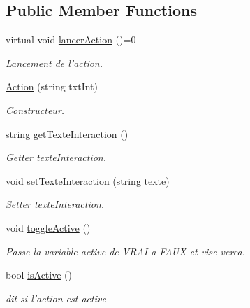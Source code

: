 \subsection*{Public Member Functions}
\begin{DoxyCompactItemize}
\item 
virtual void \hyperlink{classAction_a47d25fc7d6ef58692a7a4c5bc7e7fbd0}{lancer\-Action} ()=0
\begin{DoxyCompactList}\small\item\em Lancement de l'action. \end{DoxyCompactList}\item 
\hyperlink{classAction_ae7e1142cb3535c940dbc86f9a3b2da52}{Action} (string txt\-Int)
\begin{DoxyCompactList}\small\item\em Constructeur. \end{DoxyCompactList}\item 
string \hyperlink{classAction_a4d7ef820e27b3e23ae3e145e4ed3cb93}{get\-Texte\-Interaction} ()
\begin{DoxyCompactList}\small\item\em Getter texte\-Interaction. \end{DoxyCompactList}\item 
void \hyperlink{classAction_a2524956139b3e1bbd780270a2208356f}{set\-Texte\-Interaction} (string texte)
\begin{DoxyCompactList}\small\item\em Setter texte\-Interaction. \end{DoxyCompactList}\item 
\hypertarget{classAction_a2a71b81a01d34c124e9e13368be67d38}{void \hyperlink{classAction_a2a71b81a01d34c124e9e13368be67d38}{toggle\-Active} ()}\label{classAction_a2a71b81a01d34c124e9e13368be67d38}

\begin{DoxyCompactList}\small\item\em Passe la variable active de V\-R\-A\-I a F\-A\-U\-X et vise verca. \end{DoxyCompactList}\item 
bool \hyperlink{classAction_ab4fe74ad00f9192b4ab9959638d31a5e}{is\-Active} ()
\begin{DoxyCompactList}\small\item\em dit si l'action est active \end{DoxyCompactList}\end{DoxyCompactItemize}


